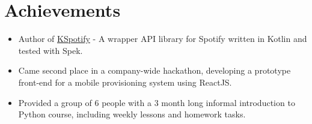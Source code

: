 \section{Achievements}

\begin{itemize}
	\setlength\itemsep{0em}
	\item Author of \href{https://github.com/mikeporterdev/spotify-kotlin}{KSpotify} - A wrapper API library for Spotify written in Kotlin and tested with Spek.
	\item Came second place in a company-wide hackathon, developing a prototype front-end for a mobile provisioning system using ReactJS. 
	\item Provided a group of 6 people with a 3 month long informal introduction to Python course, including weekly lessons and homework tasks. 
\end{itemize}